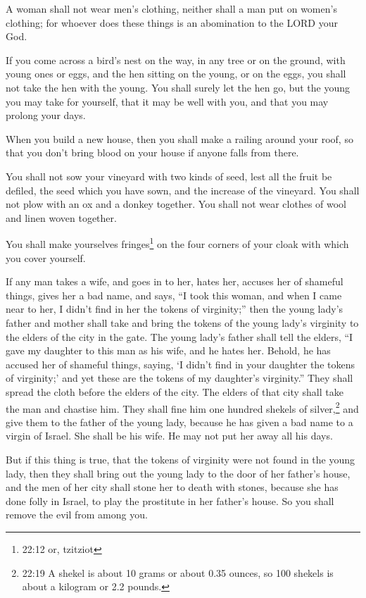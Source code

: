 \myverse{}A woman shall not wear men’s clothing, neither shall a man put
on women’s clothing; for whoever does these things is an abomination to the LORD your God.

\myverse{}If you come across a bird’s nest on the way, in any tree or on
the ground, with young ones or eggs, and the hen sitting on the young, or on the eggs, you shall not take
the hen with the young.
\myverse{}You shall surely let the hen go, but the young you may take for yourself, that
it may be well with you, and that you may prolong your days.

\myverse{}When you build a new house, then you shall make a railing around
your roof, so that you don’t bring blood on your house if anyone falls from there.

\myverse{}You shall not sow your vineyard with two kinds of seed, lest all
the fruit be defiled, the seed which you have sown, and the increase of the vineyard.
\myverse{}You shall not plow with an ox and a donkey together.
\myverse{}You shall not wear clothes of wool and linen woven together.

\myverse{}You shall make yourselves fringes\footnote{22:12 or, tzitziot} on the four corners of your cloak with which you cover yourself.

\myverse{}If any man takes a wife, and goes in to her, hates her,
\myverse{}accuses her of shameful things, gives her a bad name, and says, “I took this
woman, and when I came near to her, I didn’t find in her the tokens of virginity;”
\myverse{}then the young lady’s father and mother shall take and bring the tokens of
the young lady’s virginity to the elders of the city in the gate.
\myverse{}The young lady’s father shall tell the elders, “I gave my daughter to this
man as his wife, and he hates her.
\myverse{}Behold, he has accused her of shameful things, saying, ‘I didn’t find in
your daughter the tokens of virginity;’ and yet these are the tokens of my daughter’s virginity.” They
shall spread the cloth before the elders of the city.
\myverse{}The elders of that city shall take the man and chastise him.
\myverse{}They shall fine him one hundred shekels of silver,\footnote{22:19 A shekel is about 10 grams or about 0.35 ounces, so 100 shekels is about a kilogram or 2.2 pounds.}
and give them to the father of the young lady, because he has given a bad name to a virgin of Israel.
She shall be his wife. He may not put her away all his days.

\myverse{}But if this thing is true, that the tokens of virginity were
not found in the young lady,
\myverse{}then they shall bring out the young lady to the door of her father’s house,
and the men of her city shall stone her to death with stones, because she has done folly in Israel, to
play the prostitute in her father’s house. So you shall remove the evil from among you.

